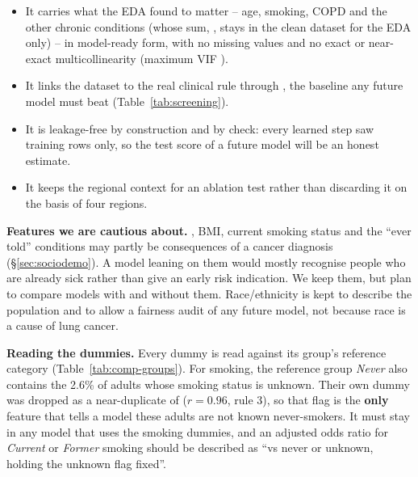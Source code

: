 \begin{itemize}
  \item It carries what the EDA found to matter -- age, smoking, COPD and the other chronic conditions (whose sum, , stays in the clean dataset for the EDA only) -- in model-ready form, with no missing values and no exact or near-exact multicollinearity (maximum VIF \maxVIFshort).
  \item It links the dataset to the real clinical rule through , the baseline any future model must beat (Table~\ref{tab:screening}).
  \item It is leakage-free by construction and by check: every learned step saw training rows only, so the test score of a future model will be an honest estimate.
  \item It keeps the regional context for an ablation test rather than discarding it on the basis of four regions.
\end{itemize}

\textbf{Features we are cautious about.} , BMI, current smoking status and the ``ever told'' conditions may partly be consequences of a cancer diagnosis (\S\ref{sec:sociodemo}). A model leaning on them would mostly recognise people who are already sick rather than give an early risk indication. We keep them, but plan to compare models with and without them. Race/ethnicity is kept to describe the population and to allow a fairness audit of any future model, not because race is a cause of lung cancer.

\textbf{Reading the dummies.} Every dummy is read against its group's reference category (Table~\ref{tab:comp-groups}). For smoking, the reference group \emph{Never} also contains the 2.6\% of adults whose smoking status is unknown. Their own dummy was dropped as a near-duplicate of  ($r = 0.96$, rule 3), so that flag is the \textbf{only} feature that tells a model these adults are not known never-smokers. It must stay in any model that uses the smoking dummies, and an adjusted odds ratio for \emph{Current} or \emph{Former} smoking should be described as ``vs never or unknown, holding the unknown flag fixed''.
